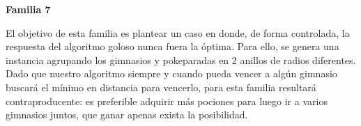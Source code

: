   \begin{figure} [h]
 \centering
    \end{figure} 

\begin{center}
\textbf{Familia 7}
\end{center}

El objetivo de esta familia es plantear un caso en donde, de forma controlada, la respuesta del algoritmo goloso nunca fuera la óptima. Para ello, se genera una instancia agrupando los gimnasios y pokeparadas en 2 anillos de radios diferentes. Dado que nuestro algoritmo siempre y cuando pueda vencer a alg\'un gimnasio buscará el m\'inimo en  distancia para vencerlo, para esta familia resultará contraproducente: es preferible adquirir m\'as pociones para luego ir a varios gimnasios juntos, que ganar apenas exista la posibilidad.

\newpage

